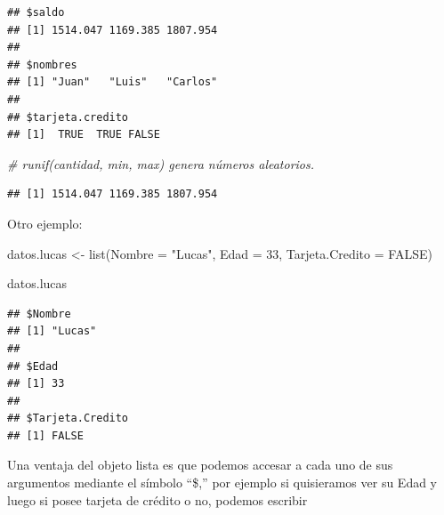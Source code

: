 \documentclass[
  12pt,
]{book}
\newenvironment{Shaded}{\begin{snugshade}}{\end{snugshade}}
\newcommand{\AttributeTok}[1]{\textcolor[rgb]{0.77,0.63,0.00}{#1}}
\newcommand{\CommentTok}[1]{\textcolor[rgb]{0.56,0.35,0.01}{\textit{#1}}}
\newcommand{\ConstantTok}[1]{\textcolor[rgb]{0.00,0.00,0.00}{#1}}
\newcommand{\DecValTok}[1]{\textcolor[rgb]{0.00,0.00,0.81}{#1}}
\newcommand{\FunctionTok}[1]{\textcolor[rgb]{0.00,0.00,0.00}{#1}}
\newcommand{\NormalTok}[1]{#1}
\newcommand{\OtherTok}[1]{\textcolor[rgb]{0.56,0.35,0.01}{#1}}
\newcommand{\SpecialCharTok}[1]{\textcolor[rgb]{0.00,0.00,0.00}{#1}}
\newcommand{\StringTok}[1]{\textcolor[rgb]{0.31,0.60,0.02}{#1}}
\begin{document}
\begin{verbatim}
## $saldo
## [1] 1514.047 1169.385 1807.954
## 
## $nombres
## [1] "Juan"   "Luis"   "Carlos"
## 
## $tarjeta.credito
## [1]  TRUE  TRUE FALSE
\end{verbatim}

\begin{Shaded}
\begin{Highlighting}[]
\CommentTok{\# runif(cantidad, min, max) genera números aleatorios.}
\end{Highlighting}
\end{Shaded}

\begin{Shaded}
\end{Shaded}

\begin{verbatim}
## [1] 1514.047 1169.385 1807.954
\end{verbatim}

Otro ejemplo:

\begin{Shaded}
\begin{Highlighting}[]
\NormalTok{datos.lucas }\OtherTok{\textless{}{-}} \FunctionTok{list}\NormalTok{(}\AttributeTok{Nombre =} \StringTok{"Lucas"}\NormalTok{, }\AttributeTok{Edad =} \DecValTok{33}\NormalTok{, }\AttributeTok{Tarjeta.Credito =} \ConstantTok{FALSE}\NormalTok{)}

\NormalTok{datos.lucas}
\end{Highlighting}
\end{Shaded}

\begin{verbatim}
## $Nombre
## [1] "Lucas"
## 
## $Edad
## [1] 33
## 
## $Tarjeta.Credito
## [1] FALSE
\end{verbatim}

Una ventaja del objeto lista es que podemos accesar a cada uno de sus argumentos mediante el símbolo ``\$,'' por ejemplo si quisieramos ver su Edad y luego si posee tarjeta de crédito o no, podemos escribir

\begin{Shaded}
\end{Shaded}
\end{document}
